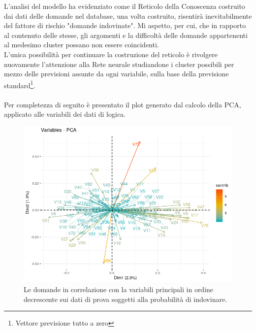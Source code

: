 \noindent L'analisi del modello ha evidenziato come il Reticolo della Conoscenza costruito  dai dati delle domande nel database, una volta costruito, risentir\`a inevitabilmente del fattore di rischio "domande indovinate". Mi aspetto, per cui, che in rapporto al contenuto delle stesse, gli argomenti e la difficolt\`a  delle domande appartenenti al medesimo cluster possano non essere coincidenti.\\
L'unica possibilit\`a per continuare la costruzione del reticolo \`e rivolgere nuovamente l'attenzione alla Rete neurale studiandone i cluster possibili per mezzo delle previsioni assunte da ogni variabile, sulla base della previsione standard\footnote{Vettore previsione tutto a zero}.\\\\
\noindent
Per completezza di seguito \`e presentato il plot generato dal calcolo della PCA, applicato alle variabili dei dati di logica.
\begin{figure}[H]
\centering
	\includegraphics[width=0.60\linewidth]{../../PCA/plot/PCA_domande-logica.png}
	\caption{Le domande in correlazione con la variabili principali in ordine decrescente sui dati di prova soggetti alla probabilità di indovinare.}
	\label{Rappresentazione per mezzo di plot di come le variabili si presentano nelle due componenti principali con il calcolo della PCA - utilizzo del set delle domande di logica.}
\end{figure}
